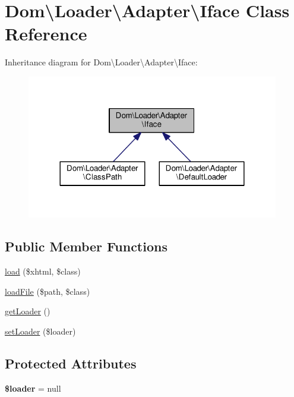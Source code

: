 \hypertarget{classDom_1_1Loader_1_1Adapter_1_1Iface}{\section{Dom\textbackslash{}Loader\textbackslash{}Adapter\textbackslash{}Iface Class Reference}
\label{classDom_1_1Loader_1_1Adapter_1_1Iface}
}


Inheritance diagram for Dom\textbackslash{}Loader\textbackslash{}Adapter\textbackslash{}Iface\+:\nopagebreak
\begin{figure}[H]
\begin{center}
\leavevmode
\includegraphics[width=312pt]{classDom_1_1Loader_1_1Adapter_1_1Iface__inherit__graph}
\end{center}
\end{figure}
\subsection*{Public Member Functions}
\begin{DoxyCompactItemize}
\item 
\hyperlink{classDom_1_1Loader_1_1Adapter_1_1Iface_a87c7d855de8796f3f83411590ee596bc}{load} (\$xhtml, \$class)
\item 
\hyperlink{classDom_1_1Loader_1_1Adapter_1_1Iface_a2214412ae086bb253bd7b0d5d02ef728}{load\+File} (\$path, \$class)
\item 
\hyperlink{classDom_1_1Loader_1_1Adapter_1_1Iface_af65cea996aed48e510d96e2c2b6744e4}{get\+Loader} ()
\item 
\hyperlink{classDom_1_1Loader_1_1Adapter_1_1Iface_a59953d4916b390dbb009c76667d435d6}{set\+Loader} (\$loader)
\end{DoxyCompactItemize}
\subsection*{Protected Attributes}
\begin{DoxyCompactItemize}
\item 
\hypertarget{classDom_1_1Loader_1_1Adapter_1_1Iface_a70960d6e1d569a44fcfed8138017536e}{{\bfseries \$loader} = null}\label{classDom_1_1Loader_1_1Adapter_1_1Iface_a70960d6e1d569a44fcfed8138017536e}

\end{DoxyCompactItemize}


